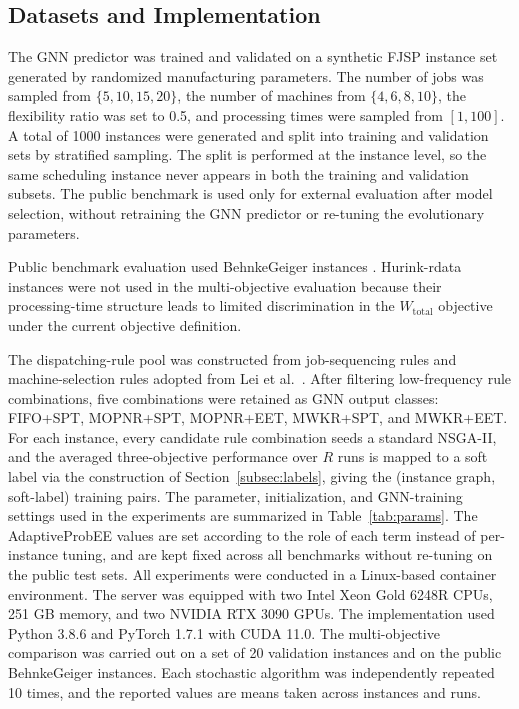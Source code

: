 \documentclass[pdflatex,iicol,Numbered,sn-basic]{sn-jnl}
\begin{document}
\subsection{Datasets and Implementation}\label{subsec:datasets}
The GNN predictor was trained and validated on a synthetic FJSP instance set generated by randomized manufacturing parameters.
The number of jobs was sampled from $\{5,10,15,20\}$, the number of machines from $\{4,6,8,10\}$, the flexibility ratio was set to 0.5, and processing times were sampled from $[1,100]$.
A total of 1000 instances were generated and split into training and validation sets by stratified sampling.
The split is performed at the instance level, so the same scheduling instance never appears in both the training and validation subsets.
The public benchmark is used only for external evaluation after model selection, without retraining the GNN predictor or re-tuning the evolutionary parameters.

Public benchmark evaluation used BehnkeGeiger instances \cite{behnke2012test}.
Hurink-rdata instances \cite{hurink1994tabu} were not used in the multi-objective evaluation because their processing-time structure leads to limited discrimination in the $W_{\mathrm{total}}$ objective under the current objective definition.

The dispatching-rule pool was constructed from job-sequencing rules and machine-selection rules adopted from Lei et al.~\cite{lei2022multi}. After filtering low-frequency rule combinations, five combinations were retained as GNN output classes: FIFO+SPT, MOPNR+SPT, MOPNR+EET, MWKR+SPT, and MWKR+EET.
For each instance, every candidate rule combination seeds a standard NSGA-II, and the averaged three-objective performance over $R$ runs is mapped to a soft label via the construction of Section~\ref{subsec:labels}, giving the (instance graph, soft-label) training pairs.
The parameter, initialization, and GNN-training settings used in the experiments are summarized in Table~\ref{tab:params}. The AdaptiveProbEE values are set according to the role of each term instead of per-instance tuning, and are kept fixed across all benchmarks without re-tuning on the public test sets.
All experiments were conducted in a Linux-based container environment. The server was equipped with two Intel Xeon Gold 6248R CPUs, 251 GB memory, and two NVIDIA RTX 3090 GPUs. The implementation used Python 3.8.6 and PyTorch 1.7.1 with CUDA 11.0. The multi-objective comparison was carried out on a set of 20 validation instances and on the public BehnkeGeiger instances. Each stochastic algorithm was independently repeated 10 times, and the reported values are means taken across instances and runs.
\end{document}
